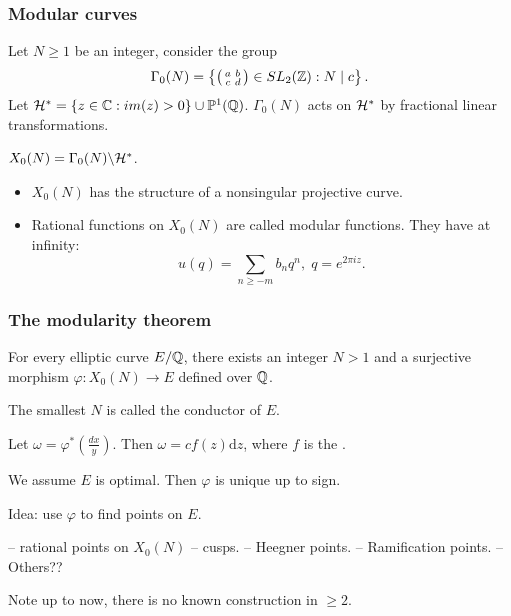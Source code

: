 \documentclass[handout]{beamer}
\begin{document}

\begin{frame}
\frametitle{Modular curves}
Let $N \geq 1$ be an integer, consider the group 
\[
	\Gamma_0(N) = \left \{ \left( \begin{smallmatrix}a&b\\c&d\end{smallmatrix}\right) \in SL_2(\mathbb{Z}): N \mid c \right\}.
\]
Let $\mathcal{H}^* = \{z \in \mathbb{C}: im(z) > 0\} \cup \mathbb{P}^1(\mathbb{Q})$.  $\Gamma_0(N)$ acts on $\mathcal{H}^{*}$ by fractional linear transformations. 

\begin{Def}
$X_0(N) = \Gamma_0(N) \backslash \mathcal{H}^*$.
\end{Def}

\begin{itemize}
\item $X_0(N)$ has the structure of a  nonsingular projective curve.
\item Rational functions on $X_0(N)$ are called modular functions. They have  at infinity:
\[
	u(q)  = \sum_{n \geq -m} b_n q^n, \; q = e^{2 \pi i z}. 
\]
\end{itemize}
\end{frame}

\begin{frame}
\frametitle{The modularity theorem}


\begin{theorem}[Modularity]
For every elliptic curve $E/\mathbb{Q}$, there exists an integer $N > 1$ and a surjective morphism 
$\varphi: X_0(N) \to E$ defined over $\mathbb{Q}$.
\end{theorem}

\pause
\smallskip

The smallest $N$ is called the conductor of $E$.  \\
\smallskip

Let $\omega = \varphi^*(\frac{dx}{y})$. Then $\omega = c f(z) \mathrm{d} z$, where $f$ is the .  \\

\smallskip

We assume $E$ is optimal. Then $\varphi$ is unique up to sign.


Idea:  use $\varphi$ to find points on $E$. 

-- rational points on $X_0(N)$ -- cusps. 
-- Heegner points. 
-- Ramification points. 
-- Others?? 

Note up to now, there is no known construction in $\geq 2$. 


\end{frame}
\end{document}

